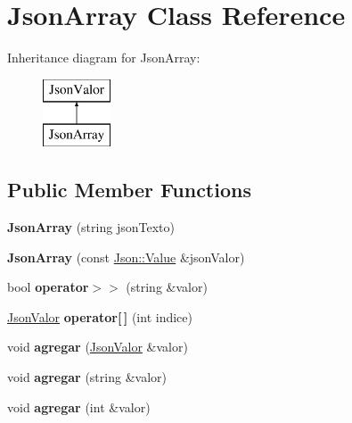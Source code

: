 \hypertarget{classJsonArray}{}\section{Json\+Array Class Reference}
\label{classJsonArray}
Inheritance diagram for Json\+Array\+:\begin{figure}[H]
\begin{center}
\leavevmode
\includegraphics[height=2.000000cm]{classJsonArray}
\end{center}
\end{figure}
\subsection*{Public Member Functions}
\begin{DoxyCompactItemize}
\item 
{\bfseries Json\+Array} (string json\+Texto)\hypertarget{classJsonArray_a334673c1a44475daa1344da330e58380}{}\label{classJsonArray_a334673c1a44475daa1344da330e58380}

\item 
{\bfseries Json\+Array} (const \hyperlink{classJson_1_1Value}{Json\+::\+Value} \&json\+Valor)\hypertarget{classJsonArray_aafdd87de39f32d32b4776e3e859426be}{}\label{classJsonArray_aafdd87de39f32d32b4776e3e859426be}

\item 
bool {\bfseries operator$>$$>$} (string \&valor)\hypertarget{classJsonArray_a330f3f187aaa60083eb6dd0facfb3a30}{}\label{classJsonArray_a330f3f187aaa60083eb6dd0facfb3a30}

\item 
\hyperlink{classJsonValor}{Json\+Valor} {\bfseries operator\mbox{[}$\,$\mbox{]}} (int indice)\hypertarget{classJsonArray_a3b63e3235fcec3c372ee9edd0441febb}{}\label{classJsonArray_a3b63e3235fcec3c372ee9edd0441febb}

\item 
void {\bfseries agregar} (\hyperlink{classJsonValor}{Json\+Valor} \&valor)\hypertarget{classJsonArray_aa96dd1741e3abe071171056557f13649}{}\label{classJsonArray_aa96dd1741e3abe071171056557f13649}

\item 
void {\bfseries agregar} (string \&valor)\hypertarget{classJsonArray_a76b4ad22a247cf0e9c124918485eb526}{}\label{classJsonArray_a76b4ad22a247cf0e9c124918485eb526}

\item 
void {\bfseries agregar} (int \&valor)\hypertarget{classJsonArray_a92f3016e9bfc4d23feb8e85b1e99341b}{}\label{classJsonArray_a92f3016e9bfc4d23feb8e85b1e99341b}

\end{DoxyCompactItemize}
